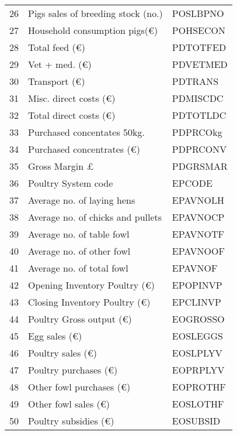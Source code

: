 \documentclass{article}\usepackage{graphicx, color}
\begin{document}
\begin{flushleft}
\begin{table}[ht]
\begin{center}
\begin{tabular}{rll}
  26 & Pigs sales of breeding stock  (no.) & POSLBPNO \\ 
  27 & Household consumption pigs(€) & POHSECON \\ 
  28 & Total feed              (€) & PDTOTFED \\ 
  29 & Vet + med.              (€) & PDVETMED \\ 
  30 & Transport               (€) & PDTRANS \\ 
  31 & Misc. direct costs      (€) & PDMISCDC \\ 
  32 & Total direct costs      (€) & PDTOTLDC \\ 
  33 & Purchased concentates  50kg. & PDPRCOkg \\ 
  34 & Purchased concentrates  (€) & PDPRCONV \\ 
  35 & Gross Margin            £ & PDGRSMAR \\ 
  36 & Poultry  System code & EPCODE \\ 
  37 & Average no. of laying hens & EPAVNOLH \\ 
  38 & Average no. of chicks and pullets & EPAVNOCP \\ 
  39 & Average no. of table fowl & EPAVNOTF \\ 
  40 & Average no. of other fowl & EPAVNOOF \\ 
  41 & Average no. of total fowl & EPAVNOF \\ 
  42 & Opening Inventory Poultry      (€) & EPOPINVP \\ 
  43 & Closing Inventory Poultry      (€) & EPCLINVP \\ 
  44 & Poultry Gross output (€) & EOGROSSO \\ 
  45 & Egg sales            (€) & EOSLEGGS \\ 
  46 & Poultry sales        (€) & EOSLPLYV \\ 
  47 & Poultry purchases    (€) & EOPRPLYV \\ 
  48 & Other fowl purchases (€) & EOPROTHF \\ 
  49 & Other fowl sales     (€) & EOSLOTHF \\ 
  50 & Poultry subsidies    (€) & EOSUBSID \\ 
   \hline
\end{tabular}
\end{center}
\end{table}



\end{flushleft}
\end{document}
